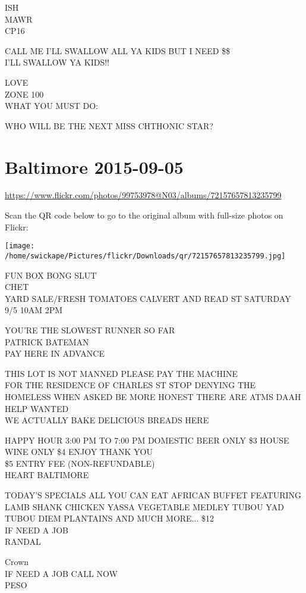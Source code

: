 \documentclass[10pt,letterpaper]{article}
\begin{document}
ISH\\
MAWR\\
CP16

CALL ME I'LL SWALLOW ALL YA KIDS BUT I NEED \$\$\\
I'LL SWALLOW YA KIDS!!

LOVE\\
ZONE 100\\
WHAT YOU MUST DO:

WHO WILL BE THE NEXT MISS CHTHONIC STAR?
\pagebreak

\section*{Baltimore 2015-09-05}

\url{https://www.flickr.com/photos/99753978@N03/albums/72157657813235799}

Scan the QR code below to go to the original album with full-size photos on Flickr:

\texttt{[image: /home/swickape/Pictures/flickr/Downloads/qr/72157657813235799.jpg]}
\pagebreak

FUN BOX BONG SLUT\\
CHET\\
YARD SALE/FRESH TOMATOES CALVERT AND READ ST SATURDAY 9/5 10AM 2PM

YOU'RE THE SLOWEST RUNNER SO FAR\\
PATRICK BATEMAN\\
PAY HERE IN ADVANCE

THIS LOT IS NOT MANNED PLEASE PAY THE MACHINE\\
FOR THE RESIDENCE OF CHARLES ST STOP DENYING THE HOMELESS WHEN ASKED BE MORE HONEST THERE ARE ATMS DAAH\\
HELP WANTED\\
WE ACTUALLY BAKE DELICIOUS BREADS HERE

HAPPY HOUR 3:00 PM TO 7:00 PM DOMESTIC BEER ONLY \$3 HOUSE WINE ONLY \$4 ENJOY THANK YOU\\
\$5 ENTRY FEE (NON{-}REFUNDABLE)\\
HEART BALTIMORE

TODAY'S SPECIALS ALL YOU CAN EAT AFRICAN BUFFET FEATURING LAMB SHANK CHICKEN YASSA VEGETABLE MEDLEY TUBOU YAD TUBOU DIEM PLANTAINS AND MUCH MORE... \$12\\
IF NEED A JOB\\
RANDAL

Crown\\
IF NEED A JOB CALL NOW\\
PESO
\end{document}
